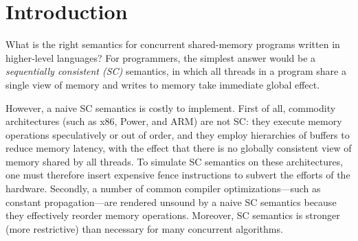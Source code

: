 \section{Introduction}\label{sec:introduction}

\newcommand{\sevcik}{\v{S}ev\v{c}\'{\i}k}

What is the right semantics for concurrent shared-memory programs
written in higher-level languages?  For programmers, the simplest
answer would be a \emph{sequentially consistent (SC)} semantics, in
which all threads in a program share a single view of memory and
writes to memory take immediate global effect.
%

However, a naive SC semantics is costly to
implement.  %
First of all, commodity architectures (such as x86, Power, and ARM)
are not SC: they execute memory operations speculatively or out of
order, and they employ hierarchies of buffers to reduce memory
latency, with the effect that there is no globally consistent view of
memory shared by all threads.  To simulate SC semantics on these
architectures, one must therefore insert expensive fence instructions
to subvert the efforts of the hardware.  Secondly, a number of common
compiler optimizations---such as constant propagation---are rendered
unsound by a naive SC semantics because they effectively reorder
memory operations.
Moreover, SC semantics is stronger (\ie more restrictive) than
necessary for many concurrent algorithms.

